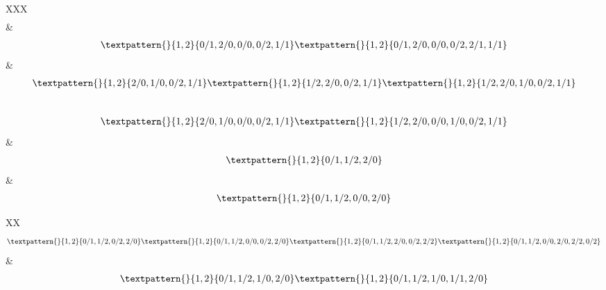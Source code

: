 \begin{center}
\begin{longtabu}[l]{XXX}
\begin{equation}
\begin{gathered}
	\end{gathered}
	\label{cls:20}
\end{equation}
    &
\begin{equation}
	\begin{gathered}
		\textpattern{}{1,2}{0/1,2/0,0/0,0/2,1/1}
		\textpattern{}{1,2}{0/1,2/0,0/0,0/2,2/1,1/1}
	\end{gathered}
	\label{cls:21}
\end{equation}
    &
\begin{equation}
	\begin{gathered}
		\textpattern{}{1,2}{2/0,1/0,0/2,1/1}
		\textpattern{}{1,2}{1/2,2/0,0/2,1/1}
		\textpattern{}{1,2}{1/2,2/0,1/0,0/2,1/1}
	\end{gathered}
	\label{cls:22}
\end{equation}
\\
\begin{equation}
	\begin{gathered}
		\textpattern{}{1,2}{2/0,1/0,0/0,0/2,1/1}
		\textpattern{}{1,2}{1/2,2/0,0/0,1/0,0/2,1/1}
	\end{gathered}
	\label{cls:23}
\end{equation}
    &
\begin{equation}
	\begin{gathered}
		\textpattern{}{1,2}{0/1,1/2,2/0}
	\end{gathered}
	\label{cls:24}
\end{equation}
    &
\begin{equation}
	\begin{gathered}
		\textpattern{}{1,2}{0/1,1/2,0/0,2/0}
	\end{gathered}
	\label{cls:25}
\end{equation}
\end{longtabu}

\noindent\begin{longtabu}[l]{XX}
\begin{equation}
	\begin{gathered}
		\textpattern{}{1,2}{0/1,1/2,0/2,2/0}
		\textpattern{}{1,2}{0/1,1/2,0/0,0/2,2/0}
		\textpattern{}{1,2}{0/1,1/2,2/0,0/2,2/2}
		\textpattern{}{1,2}{0/1,1/2,0/0,2/0,2/2,0/2}
	\end{gathered}
	\label{cls:26}
\end{equation}
    &
\begin{equation}
	\begin{gathered}
		\textpattern{}{1,2}{0/1,1/2,1/0,2/0}
		\textpattern{}{1,2}{0/1,1/2,1/0,1/1,2/0}
	\end{gathered}
	\label{cls:27}
\end{equation}
\end{longtabu}


\end{center}
